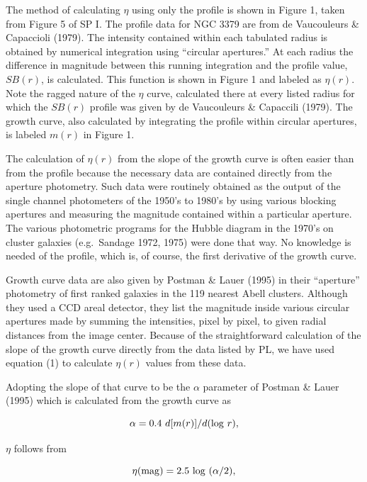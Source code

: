 \documentclass[preprint]{aastex}
\begin{document}
The method of calculating $\eta$ using only the profile is shown in
Figure 1, taken from Figure 5 of SP I. The profile data for NGC 3379
are from de Vaucouleurs \& Capaccioli (1979). The intensity contained
within each tabulated radius is obtained by numerical integration
using ``circular apertures.'' At each radius the difference in
magnitude between this running integration and the profile value,
$SB(r)$, is calculated. This function is shown in Figure 1 and labeled
as $\eta(r)$. Note the ragged nature of the $\eta$ curve, calculated
there at every listed radius for which the $SB(r)$ profile was given
by de Vaucouleurs \& Capaccili (1979). The growth curve, also
calculated by integrating the profile within circular apertures, is
labeled $m(r)$ in Figure 1.

The calculation of $\eta(r)$ from the slope of the growth curve is
often easier than from the profile because the necessary data are
contained directly from the aperture photometry. Such data were
routinely obtained as the output of the single channel photometers of
the 1950's to 1980's by using various blocking apertures and measuring
the magnitude contained within a particular aperture. The various
photometric programs for the Hubble diagram in the 1970's on cluster
galaxies (e.g.\ Sandage 1972, 1975) were done that way. No knowledge
is needed of the profile, which is, of course, the first derivative of
the growth curve.

Growth curve data are also given by Postman \& Lauer (1995) in their
``aperture'' photometry of first ranked galaxies in the 119 nearest
Abell clusters. Although they used a CCD areal detector, they list the
magnitude inside various circular apertures made by summing the
intensities, pixel by pixel, to given radial distances from the image
center. Because of the straightforward calculation of the slope of the
growth curve directly from the data listed by PL, we have used
equation (1) to calculate $\eta(r)$ values from these data.

Adopting the slope of that curve to be the $\alpha$ parameter of
Postman \& Lauer (1995) which is calculated from the growth curve as

\begin{equation}
             \alpha = 0.4~d[m(r)]/d({\rm log}~r),
\end{equation}
     
\noindent $\eta$ follows from

\begin{equation}
               \eta({\rm mag}) = 2.5~{\rm log}~(\alpha/2),
\end{equation}
\end{document}
